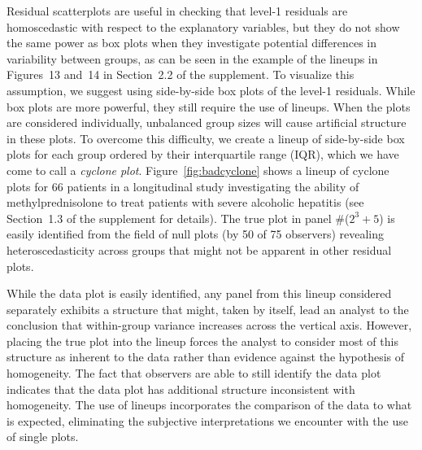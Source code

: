\documentclass[12pt]{article}
\newcommand{\alnote}[1]{\todo[inline,color=green!40]{#1}} %
\newcommand{\var}{\ensuremath{\mathrm{Var}}}
\begin{document}
Residual scatterplots are useful in checking that level-1 residuals are homoscedastic with respect to the explanatory variables, but they do not show the same power as box plots when they investigate potential differences in variability between groups, as can be seen in the example of the lineups in Figures~13 and~14 in Section~2.2 of the supplement. 
To visualize this assumption, we suggest using side-by-side box plots of the level-1 residuals. 
While box plots are more powerful, they still require the use of lineups.
When the plots are considered individually, unbalanced group sizes will cause artificial structure in these plots. 
To overcome this difficulty, we create a lineup of side-by-side box plots for each group ordered by their interquartile range (IQR), which we have come to call a \emph{cyclone plot}. Figure~\ref{fig:badcyclone} shows a lineup of cyclone plots for 66 patients in a longitudinal study investigating the ability of methylprednisolone to treat patients with severe alcoholic hepatitis (see Section~1.3 of the supplement for details). The true plot in panel \#($2^3+5$) is easily identified from the field of null plots (by 50 of 75 observers) revealing heteroscedasticity across groups that might not be apparent  in other residual plots.

While the data plot is easily identified, any panel from this lineup considered separately exhibits a structure that might, taken by itself, lead an analyst to the conclusion that within-group variance increases across the vertical axis. However, placing the true plot into the lineup forces the analyst to consider most of this structure as inherent to the data rather than evidence against the hypothesis of homogeneity. The fact that observers are able to still identify the data plot indicates that the data plot has additional structure inconsistent with homogeneity. The use of lineups incorporates the comparison of the data to what is expected, eliminating the subjective interpretations we encounter with the use of single plots. 
\end{document}
